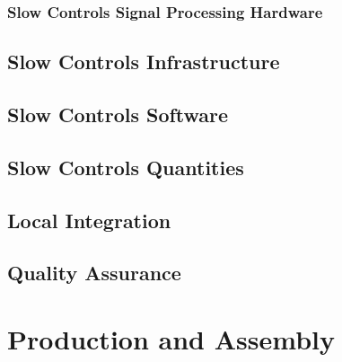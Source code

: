 \subsubsection{Slow Controls Signal Processing Hardware}
\label{sec:fdsp-slow-cryo-slow-dsp}



\subsection{Slow Controls Infrastructure}
\label{sec:fdsp-slow-cryo-slow-infra}

\subsection{Slow Controls Software}
\label{sec:fdsp-slow-cryo-sw}

\subsection{Slow Controls Quantities}
\label{sec:fdsp-slow-cryo-quant}

\subsection{Local Integration}
\label{sec:fdsp-slow-cryo-slow-loc-integ}

\subsection{Quality Assurance}
\label{sec:fdsp-slow-cryo-slow-qa}


\section{Production and Assembly}
\label{sec:fdsp-slow-cryo-prod-assy}


